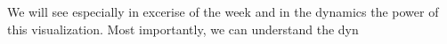 We will see especially in excerise of the week and in the dynamics the power of this visualization. Most importantly, we can understand the dyn